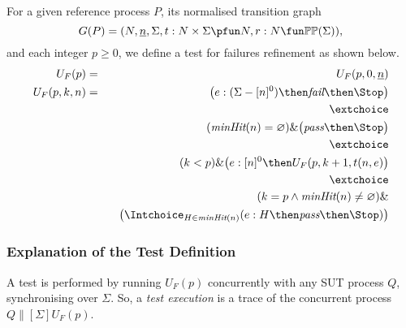 For a given reference process $P$, its normalised transition graph
$$
G(P) = ( N, \ii n, \Sigma, t : N\times\Sigma \pfun N, r : N \fun \mathbb{P}\mathbb{P}(\Sigma)),
$$
and each integer $p\ge 0$, we define a test for failures refinement as shown
below. %
%
%
\begin{eqnarray}
\label{eq:UFP}
U_F(p) & = & U_F(p,0,\ii n)
\\
U_F(p,k,n) & = & \big(e:(\Sigma - [n]^0)  \then \efail\then \Stop \big)
\label{eq:ufa}
\\ & & \extchoice \nonumber
\\ & & (\minhits(n) =   \varnothing  )    \&   \big( \epass \then \Stop \big)
\label{eq:ufb}
\\ & & \extchoice \nonumber
\\ & & (k < p) \& \big(e:[n]^0   \then U_F(p,k+1,t(n,e) \big)
\label{eq:ufc}
\\ & & \extchoice \nonumber
\\ & & (k = p \wedge \minhits(n)\neq\varnothing) \&  \nonumber
\\ & & \taba \big( \Intchoice_{H\in\minhits(n)} (e:H   \then \epass \then\Stop   )  \big)
\label{eq:ufd}
\end{eqnarray}

\subsubsection*{Explanation of the Test Definition}
A test is performed by running $U_F(p)$ concurrently with any SUT process
$Q$, synchronising over $\Sigma$. So, a \emph{test execution} is a trace of the
concurrent process
$Q\parallel[\Sigma] U_F(p)$.


